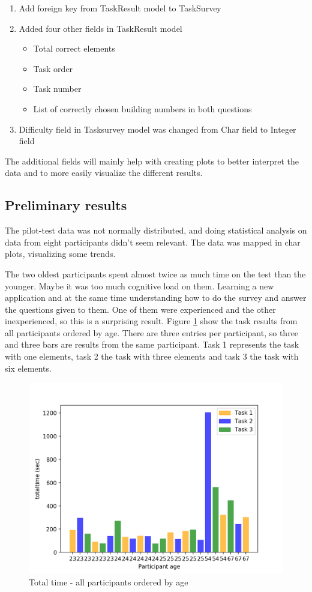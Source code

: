 \begin{enumerate}
	\item Add foreign key from TaskResult model to TaskSurvey
	\item Added four other fields in TaskResult model
	\begin{itemize}
		\item Total correct elements 
		\item Task order
		\item Task number
		\item List of correctly chosen building numbers in both questions
	\end{itemize}
	\item Difficulty field in Tasksurvey model was changed from Char field to Integer field
\end{enumerate}

The additional fields will mainly help with creating plots to better interpret the data and to more easily visualize the different results. 

\subsection{Preliminary results}\label{sec:preliminalyresult}
The pilot-test data was not normally distributed, and doing statistical analysis on data from eight participants didn't seem relevant. The data was mapped in char plots, visualizing some trends. 

The two oldest participants spent almost twice as much time on the test than the younger. Maybe it was too much cognitive load on them. Learning a new application and at the same time understanding how to do the survey and answer the questions given to them. One of them were experienced and the other inexperienced, so this is a surprising result. Figure \ref{fig:allparticipantssortedageparticipantexclude4labelage} show the task results from all participants ordered by age. There are three entries per participant, so three and three bars are results from the same participant. Task 1 represents the task with one elements, task 2 the task with three elements and task 3 the task with six elements.

\begin{figure}[H]
	\centering
	\includegraphics[width=0.7\linewidth]{fig/allParticipants_sorted_Age_Participant_exclude4_labelage}
	\caption[Total time, all]{Total time - all participants ordered by age}
	\label{fig:allparticipantssortedageparticipantexclude4labelage}
\end{figure}

